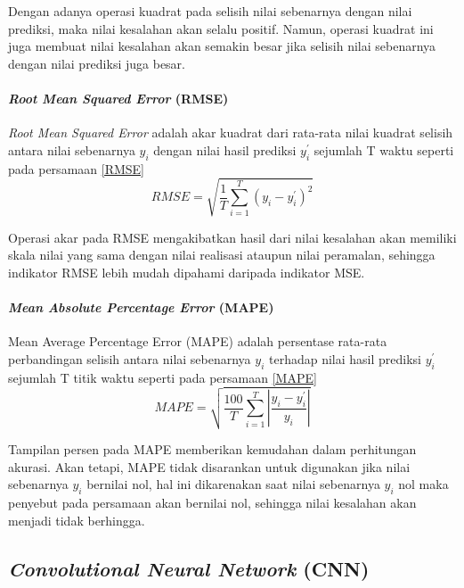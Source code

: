 \documentclass[../thesis.tex]{subfiles}
\begin{document}
Dengan adanya operasi kuadrat pada selisih nilai sebenarnya dengan nilai prediksi, maka nilai kesalahan akan selalu positif. Namun, operasi kuadrat ini juga membuat nilai kesalahan 
akan semakin besar jika selisih nilai sebenarnya dengan nilai prediksi juga besar.


\paragraph{\textit{Root Mean Squared Error} (RMSE)}

\textit{Root Mean Squared Error} adalah akar kuadrat dari rata-rata nilai kuadrat selisih antara nilai sebenarnya $y_i$ dengan nilai hasil prediksi $y^{'}_i$ sejumlah T waktu seperti pada persamaan \ref{RMSE}
\begin{equation}\label{RMSE}
	RMSE = \sqrt{\frac {1}{T}\sum \limits_{i=1}^{T} {(y_i - y^{'}_i)^2}}
\end{equation}

Operasi akar pada RMSE mengakibatkan hasil dari nilai kesalahan akan memiliki skala nilai yang sama dengan nilai realisasi ataupun nilai peramalan, sehingga
indikator RMSE lebih mudah dipahami daripada indikator MSE. 

\paragraph{\textit{Mean Absolute Percentage Error} (MAPE)}

Mean Average Percentage Error (MAPE) adalah persentase rata-rata perbandingan selisih antara nilai sebenarnya $y_i$ terhadap nilai hasil prediksi $y^{'}_i$ sejumlah T
titik waktu seperti pada persamaan \ref{MAPE}
\begin{equation}\label{MAPE}
	MAPE = \sqrt{\frac {100}{T}\sum \limits_{i=1}^{T} {\left|{\frac {y_i - y^{'}_i}{y_i}}\right|}}
\end{equation}

Tampilan persen pada MAPE memberikan kemudahan dalam perhitungan akurasi. Akan tetapi, MAPE tidak disarankan untuk digunakan jika nilai sebenarnya $y_i$
bernilai nol, hal ini dikarenakan saat nilai sebenarnya $y_i$ nol maka penyebut pada persamaan akan bernilai nol, sehingga nilai kesalahan akan menjadi tidak berhingga.

\subsection{\textit{Convolutional Neural Network} (CNN)}
\end{document}
